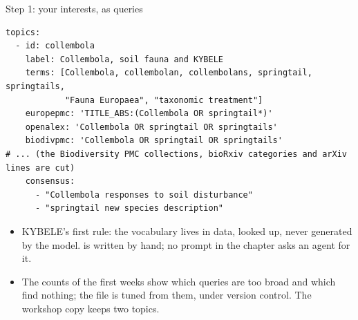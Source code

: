 \documentclass[11pt,aspectratio=169]{beamer}
\begin{document}
\begin{frame}[fragile]{Step 1: your interests, as queries}
  \begin{lstlisting}[basicstyle=\ttfamily\scriptsize]
topics:
  - id: collembola
    label: Collembola, soil fauna and KYBELE
    terms: [Collembola, collembolan, collembolans, springtail, springtails,
            "Fauna Europaea", "taxonomic treatment"]
    europepmc: 'TITLE_ABS:(Collembola OR springtail*)'
    openalex: 'Collembola OR springtail OR springtails'
    biodivpmc: 'Collembola OR springtail OR springtails'
# ... (the Biodiversity PMC collections, bioRxiv categories and arXiv lines are cut)
    consensus:
      - "Collembola responses to soil disturbance"
      - "springtail new species description"
  \end{lstlisting}
  \small
  \begin{itemize}
    \item KYBELE's first rule: the vocabulary lives in data, looked up, never generated by the model.  is written by hand; no prompt in the chapter asks an agent for it.
    \item The counts of the first weeks show which queries are too broad and which find nothing; the file is tuned from them, under version control. The workshop copy keeps two topics.
  \end{itemize}
\end{frame}
\end{document}
